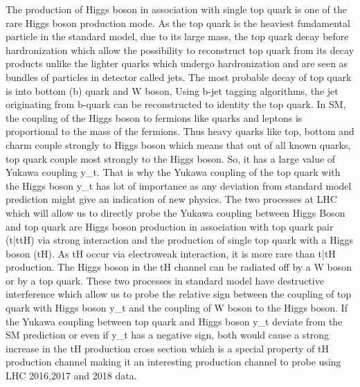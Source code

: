 \documentclass[final,3p]{CSP}
\begin{document}
The production of Higgs boson in association with single top quark is one of the rare Higgs boson production mode. As the top 
quark is the heaviest fundamental particle in the standard model, due to its large mass, the top quark decay before 
hardronization which allow the possibility to reconstruct top quark from its decay products unlike the lighter quarks which 
undergo hardronization and are seen as bundles of particles in detector called jets. The most probable decay of top quark is into 
bottom (b) quark and W boson. Using b-jet tagging algorithms, the jet originating from b-quark can be reconstructed to identity 
the top quark. In SM, the coupling of the Higgs boson to fermions like quarks and leptons is proportional to the mass of the 
fermions. Thus heavy quarks like top, bottom and charm couple strongly to Higgs boson which means that out of all known quarks, 
top quark couple most strongly to the Higgs boson. So, it has a large value of Yukawa coupling y_t. That is why the Yukawa 
coupling of the top quark with the Higgs boson y_t has lot of importance as any deviation from standard model prediction might 
give an indication of new physics. The two processes at LHC which will allow us to directly probe the Yukawa coupling between 
Higgs Boson and top quark are Higgs boson production in association with top quark pair (t\bar{t}tH) via strong interaction and 
the production of single top quark with a Higgs boson (tH). As tH occur via electroweak interaction, it is more rare than 
t\bar{t}H production. The Higgs boson in the tH channel can be radiated off by a W boson or by a top quark. These two processes 
in standard model have destructive interference which allow us to probe the relative sign between the coupling of top quark with 
Higgs boson y_t and the coupling of W boson to the Higgs boson. If the Yukawa coupling between top quark and Higgs boson y_t 
deviate from the SM prediction or even if y_t has a negative sign, both would cause a strong increase in the tH production cross 
section which is a special property of tH production channel making it an interesting production channel to probe using LHC 
2016,2017 and 2018 data.  
\end{document}
